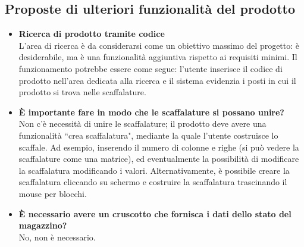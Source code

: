 \subsection{Proposte di ulteriori funzionalità del prodotto}
\begin{itemize}
        \item \textbf{Ricerca di prodotto tramite codice}\\
        L'area di ricerca è da considerarsi come un obiettivo massimo del progetto: è desiderabile, ma è una funzionalità aggiuntiva rispetto ai requisiti minimi. Il funzionamento potrebbe essere come segue: l'utente inserisce il codice di prodotto nell'area dedicata alla ricerca e il sistema evidenzia i posti in cui il prodotto si trova nelle scaffalature.
        \item \textbf{È importante fare in modo che le scaffalature si possano unire?}\\
        Non c'è necessità di unire le scaffalature; il prodotto deve avere una funzionalità ``crea scaffalatura", mediante la quale l'utente costruisce lo scaffale. Ad esempio, inserendo il numero di colonne e righe (si può vedere la scaffalature come una matrice), ed eventualmente la possibilità di modificare la scaffalatura modificando i valori. Alternativamente, è possibile creare la scaffalatura cliccando su schermo e costruire la scaffalatura trascinando il mouse per blocchi.
        \item \textbf{È necessario avere un cruscotto che fornisca i dati dello stato del magazzino?}\\
        No, non è necessario.
    \end{itemize}